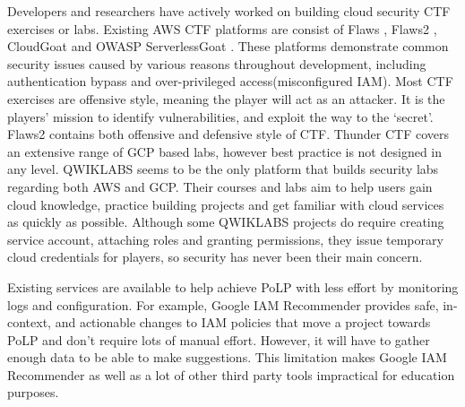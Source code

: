 Developers and researchers have actively worked on building cloud security CTF exercises or labs. Existing AWS CTF platforms are consist of  Flaws \cite{flaws}, Flaws2 \cite{flaws2}, CloudGoat \cite{cloudgoat} and OWASP ServerlessGoat \cite{serverlessgoat}. These platforms demonstrate common security issues caused by various reasons throughout development, including authentication bypass and over-privileged access(misconfigured IAM). Most CTF exercises are offensive style, meaning the player will act as an attacker. It is the players’ mission to identify vulnerabilities, and exploit the way to the ‘secret’. Flaws2 contains both offensive and defensive style of CTF. Thunder CTF \cite{thunder-ctf} covers an extensive range of GCP based labs, however best practice is not designed in any level. QWIKLABS \cite{QWIKLABS} seems to be the only platform that builds security labs regarding both AWS and GCP. Their courses and labs aim to help users gain cloud knowledge, practice building projects and get familiar with cloud services as quickly as possible. Although some QWIKLABS projects do require creating service account, attaching roles and granting permissions, they issue temporary cloud credentials for players, so security has never been their main concern.

Existing services are available to help achieve PoLP with less effort by monitoring logs and configuration. For example, Google IAM Recommender \cite{GoogleLstRec} provides safe, in-context, and actionable changes to IAM policies that move a project towards PoLP and don’t require lots of manual effort. However, it will have to gather enough data to be able to make suggestions. This limitation makes Google IAM Recommender as well as a lot of other third party tools impractical for education purposes.